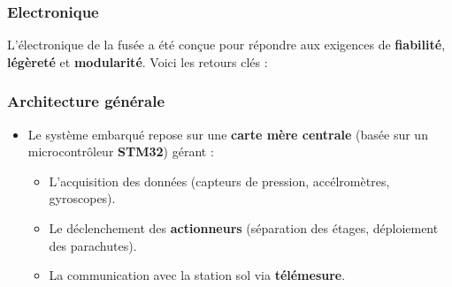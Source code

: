 \subsubsection{Electronique}
L’électronique de la fusée a été conçue pour répondre aux exigences de \textbf{fiabilité}, \textbf{légèreté} et \textbf{modularité}. Voici les retours clés :

\subsubsection*{Architecture générale}
\begin{itemize}
    \item Le système embarqué repose sur une \textbf{carte mère centrale} (basée sur un microcontrôleur \textbf{STM32}) gérant :
    \begin{itemize}
        \item L’acquisition des données (capteurs de pression, accélromètres, gyroscopes).
        \item Le déclenchement des \textbf{actionneurs} (séparation des étages, déploiement des parachutes).
        \item La communication avec la station sol via \textbf{télémesure}.
    \end{itemize}
\end{itemize}

